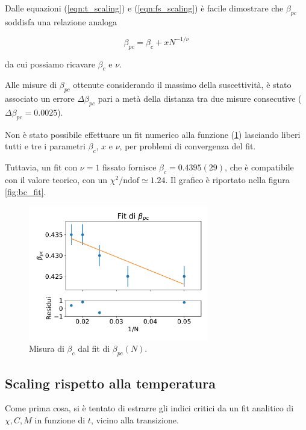 \documentclass[a4paper,11pt]{article}
\begin{document}
    Dalle equazioni (\ref{eqn:t_scaling}) e (\ref{eqn:fs_scaling}) è facile dimostrare che $\beta_{pc}$ soddisfa una relazione analoga
    
    \begin{equation}
        \beta_{pc} = \beta_c + x N^{-1/\nu}
        \label{eqn:bpc_scaling}
    \end{equation}
    
    da cui possiamo ricavare $\beta_c$ e $\nu$.
    
    Alle misure di $\beta_{pc}$ ottenute considerando il massimo della suscettività, è stato associato un errore $\Delta \beta_{pc}$ pari a metà della distanza tra due misure consecutive ($\Delta \beta_{pc} = 0.0025$).
    
    Non è stato possibile effettuare un fit numerico alla funzione (\ref{eqn:bpc_scaling}) lasciando liberi tutti e tre i parametri $\beta_c$, $x$ e $\nu$, per problemi di convergenza del fit.
    
    Tuttavia, un fit con $\nu = 1$ fissato fornisce $\beta_c = 0.4395(29)$, che è compatibile con il valore teorico, con un $\chi^2 / \text{ndof} \simeq 1.24$. Il grafico è riportato nella figura \ref{fig:bc_fit}.
    
    \begin{figure}
        \centering
        \includegraphics[width=0.7\textwidth]{figure/fit_bpc.pdf}
        \caption{Misura di $\beta_c$ dal fit di $\beta_{pc}(N)$.}
        \label{eqn:bpc_scaling}
    \end{figure}


	
	\subsection{Scaling rispetto alla temperatura}
	
	Come prima cosa, si è tentato di estrarre gli indici critici da un fit analitico di $\chi, C, M$ in funzione di $t$, vicino alla transizione.
\end{document}
